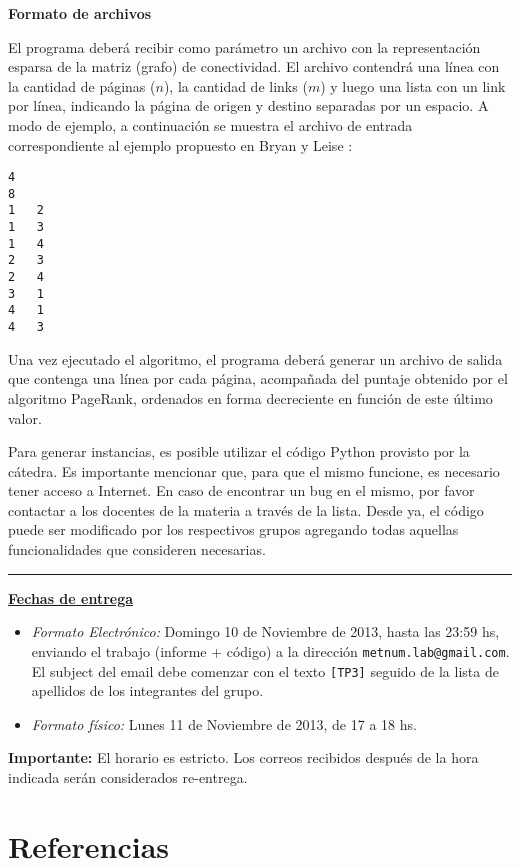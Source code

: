 \textbf{Formato de archivos}

El programa deber\'a recibir como par\'ametro un archivo con la representaci\'on esparsa de la matriz (grafo) de
conectividad. El archivo contendr\'a una l\'inea con la cantidad de p\'aginas ($n$), la cantidad de links ($m$) y luego
una lista con un link por l\'inea, indicando la p\'agina de origen y destino separadas por un espacio. A modo de
ejemplo, a continuaci\'on se muestra el archivo de entrada correspondiente al ejemplo propuesto en Bryan y Leise
\cite[Figura 1]{Bryan2006}: 

\begin{verbatim}
4 
8 
1   2
1   3
1   4
2   3
2   4
3   1
4   1
4   3
\end{verbatim}

Una vez ejecutado el algoritmo, el programa deber\'a generar un archivo de salida que contenga una l\'inea por cada
p\'agina, acompa\~nada del puntaje obtenido por el algoritmo PageRank, ordenados en forma decreciente en funci\'on de
este \'ultimo valor.

Para generar instancias, es posible utilizar el c\'odigo Python provisto por la c\'atedra. Es importante mencionar que, para que el mismo funcione, es
necesario tener acceso a Internet. En caso de encontrar un bug en el mismo, por favor contactar a los docentes de la
materia a trav\'es de la lista. Desde ya, el c\'odigo puede ser modificado por los respectivos grupos agregando todas
aquellas funcionalidades que consideren necesarias.

\vskip 15pt

\hrule

\vskip 11pt


{\bf \underline{Fechas de entrega}}
\begin{itemize}
 \item \emph{Formato Electr\'onico:} Domingo 10 de Noviembre de 2013, hasta las 23:59 hs, enviando el trabajo (informe +
 c\'odigo) a la direcci\'on \verb+metnum.lab@gmail.com+. El subject del email debe comenzar con el texto \verb+[TP3]+
 seguido de la lista de apellidos  de los integrantes del grupo.
 \item \emph{Formato f\'isico:} Lunes 11 de Noviembre de 2013, de 17 a 18 hs.
\end{itemize}

\noindent \textbf{Importante:} El horario es estricto. Los correos recibidos despu\'es de la hora indicada ser\'an considerados re-entrega.

\section{Referencias}

